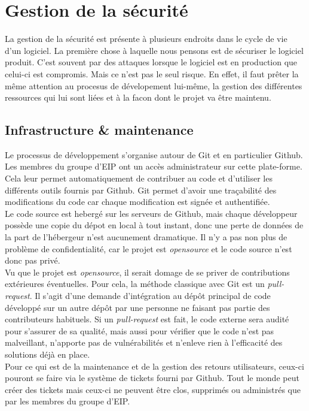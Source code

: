 \section{Gestion de la sécurité}

La gestion de la sécurité est présente à plusieurs endroits dans le cycle de vie d'un logiciel. La première chose à laquelle nous pensons est de sécuriser le logiciel produit. C'est souvent par des attaques lorsque le logiciel est en production que celui-ci est compromis. Mais ce n'est pas le seul risque. En effet, il faut prêter la même attention au procesus de dévelopement lui-même, la gestion des différentes ressources qui lui sont liées et à la facon dont le projet va être maintenu.

\subsection{Infrastructure \& maintenance}

Le processus de développement s'organise autour de Git et en particulier Github. Les membres du groupe d'EIP ont un accès administrateur sur cette plate-forme. Cela leur permet automatiquement de contribuer au code et d'utiliser les différents outils fournis par Github. Git permet d'avoir une traçabilité des modifications du code car chaque modification est signée et authentifiée.\\

Le code source est hebergé sur les serveurs de Github, mais chaque développeur possède une copie du dépot en local à tout instant, donc une perte de données de la part de l'hébergeur n'est aucunement dramatique. Il n'y a pas non plus de problème de confidentialité, car le projet est \textit{opensource} et le code source n'est donc pas privé.\\

Vu que le projet est \textit{opensource}, il serait domage de se priver de contributions extérieures éventuelles. Pour cela, la méthode classique avec Git est un \textit{pull-request}. Il s'agit d'une demande d'intégration au dépôt principal de code développé sur un autre dépôt par une personne ne faisant pas partie des contributeurs habituels. Si un \textit{pull-request} est fait, le code externe sera audité pour s'assurer de sa qualité, mais aussi pour vérifier que le code n'est pas malveillant, n'apporte pas de vulnérabilités et n'enleve rien à l'efficacité des solutions déjà en place.\\

Pour ce qui est de la maintenance et de la gestion des retours utilisateurs, ceux-ci pouront se faire via le système de tickets fourni par Github. Tout le monde peut créer des tickets mais ceux-ci ne peuvent être clos, supprimés ou administrés que par les membres du groupe d'EIP.


